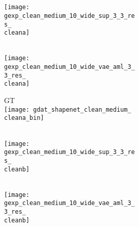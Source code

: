 \begin{figure}[t]
{\begin{subfigure}[t]{0.5\textwidth}
    \end{subfigure}
    \\[4px]
    \renewcommand{\cleana}{297} %
    \renewcommand{\cleanb}{0} %
    \renewcommand{\noisya}{264} %
    \renewcommand{\noisyb}{99} %
    \begin{subfigure}[t]{0.5\textwidth}
        \vspace{0px}\centering
        \begin{subfigure}[t]{0.15\textwidth}
            \vspace{0px}\centering
            \Dai\\
            \texttt{[image: gexp\_clean\_medium\_10\_wide\_sup\_3\_3\_res\_\\cleana]}
        \end{subfigure}
        \begin{subfigure}[t]{0.15\textwidth}
        	\vspace{0px}\centering
        	\AML\\
        	\texttt{[image: gexp\_clean\_medium\_10\_wide\_vae\_aml\_3\_3\_res\_\\cleana]}
        \end{subfigure}
        \begin{subfigure}[t]{0.15\textwidth}
            \vspace{0px}\centering
            GT\\
            \texttt{[image: gdat\_shapenet\_clean\_medium\_\\cleana\_bin]}
        \end{subfigure}
        \begin{subfigure}[t]{0.15\textwidth}
            \vspace{0px}\centering
            \Dai\\
            \texttt{[image: gexp\_clean\_medium\_10\_wide\_sup\_3\_3\_res\_\\cleanb]}
        \end{subfigure}
        \begin{subfigure}[t]{0.15\textwidth}
            \vspace{0px}\centering
            \AML\\
            \texttt{[image: gexp\_clean\_medium\_10\_wide\_vae\_aml\_3\_3\_res\_\\cleanb]}

\end{subfigure}
\end{subfigure}}
\end{figure}

